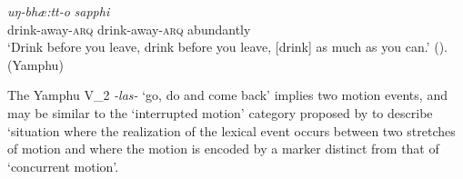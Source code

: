 \documentclass[oneside,a4paper,11pt]{article}
\newcommand{\ipa}[1]{{\phon\textit{#1}}}
\newcommand{\sens}[1]{‘#1’}
\newcommand{\rouge}[1]{{\color{red}#1}}
\begin{document}
 \begin{exe}
\ex \label{ex:uŋbhaetto}
\gll \ipa{uŋ-\rouge{bhæ:tt}-o}	\ipa{uŋ-\rouge{bhæ:tt}-o}	\ipa{sapphi} \\
drink-\rouge{away}-\textsc{arq} drink-\rouge{away}-\textsc{arq}  abundantly\\
\glt \sens{Drink before you leave, drink before you leave, [drink] as much as you can.} (\citealt[150]{rutgers98yamphu}). (Yamphu)
\end{exe}

The Yamphu V_2 \ipa{-las-} `go, do and come back' implies two motion events, and may be similar to the `interrupted motion' category proposed by \citet[123]{rose15am} to describe `situation where the realization of the lexical event occurs between two stretches of motion and where the motion is encoded by a marker distinct from that of `concurrent motion'.
\end{document}
